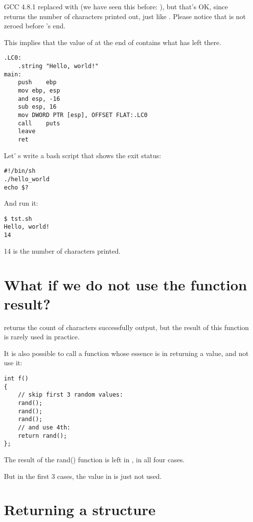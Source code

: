 GCC 4.8.1 replaced \printf with \puts 
(we have seen this before: ), but that's OK,
since \puts returns the number of characters printed out, just like \printf.
Please notice that \EAX is not zeroed before \main's end.

This implies that the value of \EAX at the end of \main contains what \puts has left there.

\begin{lstlisting}[caption=GCC 4.8.1]
.LC0:
	.string	"Hello, world!"
main:
	push	ebp
	mov	ebp, esp
	and	esp, -16
	sub	esp, 16
	mov	DWORD PTR [esp], OFFSET FLAT:.LC0
	call	puts
	leave
	ret
\end{lstlisting}


Let' s write a bash script that shows the exit status:

\begin{lstlisting}[caption=tst.sh]
#!/bin/sh
./hello_world
echo $?
\end{lstlisting}

And run it:

\begin{lstlisting}
$ tst.sh 
Hello, world!
14
\end{lstlisting}

14 is the number of characters printed.

\section{What if we do not use the function result?}

\printf returns the count of characters successfully output, but the result of this function 
is rarely used in practice.

It is also possible to call a function whose essence is in returning a value, and not use it:

\begin{lstlisting}
int f()
{
    // skip first 3 random values:
    rand();
    rand();
    rand();
    // and use 4th:
    return rand();
};
\end{lstlisting}

The result of the rand() function is left in \EAX, in all four cases.

But in the first 3 cases, the value in \EAX is just not used.

\section{Returning a structure}

